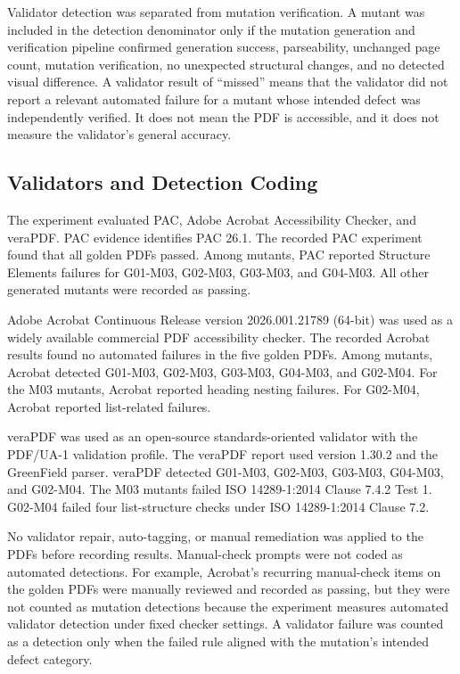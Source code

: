 \documentclass[conference]{IEEEtran}
\begin{document}
Validator detection was separated from mutation verification. A mutant was included in the detection denominator only if the mutation generation and verification pipeline confirmed generation success, parseability, unchanged page count, mutation verification, no unexpected structural changes, and no detected visual difference. A validator result of ``missed'' means that the validator did not report a relevant automated failure for a mutant whose intended defect was independently verified. It does not mean the PDF is accessible, and it does not measure the validator's general accuracy.

\subsection{Validators and Detection Coding}

The experiment evaluated PAC, Adobe Acrobat Accessibility Checker, and veraPDF. PAC evidence identifies PAC 26.1. The recorded PAC experiment found that all golden PDFs passed. Among mutants, PAC reported Structure Elements failures for G01-M03, G02-M03, G03-M03, and G04-M03. All other generated mutants were recorded as passing.

Adobe Acrobat Continuous Release version 2026.001.21789 (64-bit) was used as a widely available commercial PDF accessibility checker. The recorded Acrobat results found no automated failures in the five golden PDFs. Among mutants, Acrobat detected G01-M03, G02-M03, G03-M03, G04-M03, and G02-M04. For the M03 mutants, Acrobat reported heading nesting failures. For G02-M04, Acrobat reported list-related failures.

veraPDF was used as an open-source standards-oriented validator with the PDF/UA-1 validation profile. The veraPDF report used version 1.30.2 and the GreenField parser. veraPDF detected G01-M03, G02-M03, G03-M03, G04-M03, and G02-M04. The M03 mutants failed ISO 14289-1:2014 Clause 7.4.2 Test 1. G02-M04 failed four list-structure checks under ISO 14289-1:2014 Clause 7.2.

No validator repair, auto-tagging, or manual remediation was applied to the PDFs before recording results. Manual-check prompts were not coded as automated detections. For example, Acrobat's recurring manual-check items on the golden PDFs were manually reviewed and recorded as passing, but they were not counted as mutation detections because the experiment measures automated validator detection under fixed checker settings. A validator failure was counted as a detection only when the failed rule aligned with the mutation's intended defect category.
\end{document}
